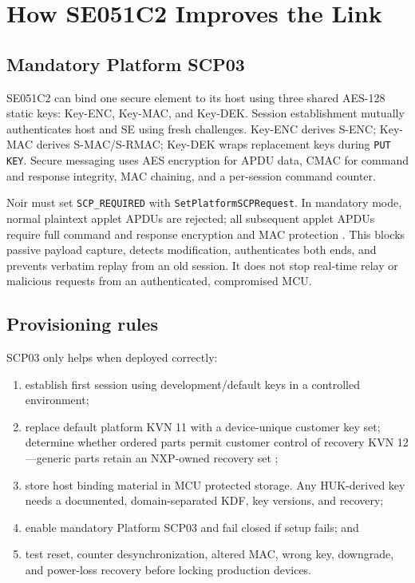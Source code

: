 \documentclass[10pt]{article}
\begin{document}
\section{How SE051C2 Improves the Link}
\subsection{Mandatory Platform SCP03}
SE051C2 can bind one secure element to its host using three shared AES-128
static keys: Key-ENC, Key-MAC, and Key-DEK. Session establishment mutually
authenticates host and SE using fresh challenges. Key-ENC derives S-ENC;
Key-MAC derives S-MAC/S-RMAC; Key-DEK wraps replacement keys during
\texttt{PUT KEY}. Secure messaging uses AES encryption for APDU data, CMAC for
command and response integrity, MAC chaining, and a per-session command counter.

Noir must set \texttt{SCP\_REQUIRED} with
\texttt{SetPlatformSCPRequest}. In mandatory mode, normal plaintext applet
APDUs are rejected; all subsequent applet APDUs require full command and
response encryption and MAC protection \cite{nxp-binding,nxp-apdu,gp-scp03}.
This blocks passive payload capture, detects modification, authenticates both
ends, and prevents verbatim replay from an old session. It does not stop
real-time relay or malicious requests from an authenticated, compromised MCU.

\subsection{Provisioning rules}
SCP03 only helps when deployed correctly:
\begin{enumerate}
  \item establish first session using development/default keys in a controlled
        environment;
  \item replace default platform KVN 11 with a device-unique customer key set;
        determine whether ordered parts permit customer control of recovery
        KVN 12---generic parts retain an NXP-owned recovery set
        \cite{se051-config};
  \item store host binding material in MCU protected storage. Any HUK-derived
        key needs a documented, domain-separated KDF, key versions, and recovery;
  \item enable mandatory Platform SCP03 and fail closed if setup fails; and
  \item test reset, counter desynchronization, altered MAC, wrong key, downgrade,
        and power-loss recovery before locking production devices.
\end{enumerate}
\end{document}
